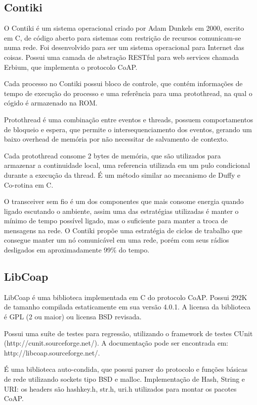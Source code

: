 \subsection{Contiki}
O Contiki \'e um sistema operacional criado por Adam Dunkels em 2000, escrito em C, de c\'odigo aberto para sistemas com restri\c{c}\~ao de recursos comunicam-se numa rede. Foi desenvolvido para ser um sistema operacional para Internet das coisas. Possui uma camada de abstra\c{c}\~ao RESTful para web services chamada Erbium, que implementa o protocolo CoAP.

Cada processo no Contiki possui bloco de controle, que cont\'em informa\-\c{c}\~oes de tempo de execu\c{c}\~ao do processo e uma refer\^encia para uma protothread, na qual o c\'ogido \'e armazenado na ROM. 

Protothread \'e uma combina\c{c}\~ao entre eventos e threads, possuem comportamentos de bloqueio e espera, que permite o intersequenciamento dos eventos, gerando um baixo overhead de mem\'oria por n\~ao necessitar de salvamento de contexto.

Cada protothread consome 2 bytes de mem\'oria, que s\~ao utilizados para armazenar a continuidade local, uma referencia utilizada em um pulo condicional durante a execu\c{c}\~ao da thread. \'E um m\'etodo similar ao mecanismo de Duffy e Co-rotina em C. \cite{duffy}

O transceiver sem fio \'e um dos componentes que mais consome energia quando ligado escutando o ambiente, assim uma das estrat\'egias utilizadas \'e manter o m\'inimo de tempo poss\'ivel ligado, mas o suficiente para manter a troca de mensagens na rede. O Contiki prop\~oe uma estrat\'egia de ciclos de trabalho que consegue manter um n\'o comunic\'avel em uma rede, por\'em com seus r\'adios desligados em aproximadamente 99\% do tempo.

\subsection{LibCoap}
LibCoap \'e uma biblioteca implementada em C do protocolo CoAP. Possui 292K de tamanho compilada estaticamente em sua vers\~ao 4.0.1.
A licensa da biblioteca \'e GPL (2 ou maior) ou licensa BSD revisada.

Possui uma su\'ite de testes para regress\~ao, utilizando o framework de testes CUnit (http://cunit.sourceforge.net/). A documenta\c{c}\~ao pode ser encontrada em: http://libcoap.sourceforge.net/.

\'E uma biblioteca auto-condida, que possui parser do protocolo e fun\c{c}\~oes b\'asicas de rede utilizando sockets tipo BSD e malloc. Implementa\c{c}\~ao de Hash, String e URI: os headers s\~ao hashkey.h, str.h, uri.h utilizados para montar os pacotes CoAP.

